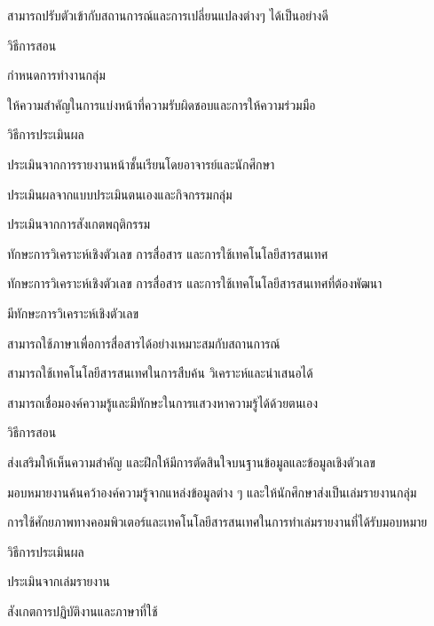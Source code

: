 \begin{edudev}
\begin{enumdev}
\begin{subenumdev}
						\item \withwc สามารถปรับตัวเข้ากับสถานการณ์และการเปลี่ยนแปลงต่างๆ ได้เป็นอย่างดี
					\end{subenumdev}
			\item วิธีการสอน
					\begin{subenumdev}
						\item กำหนดการทำงานกลุ่ม
						\item ให้ความสำคัญในการแบ่งหน้าที่ความรับผิดชอบและการให้ความร่วมมือ
					\end{subenumdev}
			\item วิธีการประเมินผล
					\begin{subenumdev}
						\item ประเมินจากการรายงานหน้าชั้นเรียนโดยอาจารย์และนักศึกษา
						\item ประเมินผลจากแบบประเมินตนเองและกิจกรรมกลุ่ม
						\item ประเมินจากการสังเกตพฤติกรรม
					\end{subenumdev}
		\end{enumdev}
\item ทักษะการวิเคราะห์เชิงตัวเลข การสื่อสาร และการใช้เทคโนโลยีสารสนเทศ
		\begin{enumdev}
			\item ทักษะการวิเคราะห์เชิงตัวเลข การสื่อสาร และการใช้เทคโนโลยีสารสนเทศที่ต้องพัฒนา
					\begin{subenumdev}
						\item \withbc มีทักษะการวิเคราะห์เชิงตัวเลข
						\item \withwc สามารถใช้ภาษาเพื่อการสื่อสารได้อย่างเหมาะสมกับสถานการณ์
						\item \withwc สามารถใช้เทคโนโลยีสารสนเทศในการสืบค้น วิเคราะห์และนำเสนอได้
						\item \withwc สามารถเชื่อมองค์ความรู้และมีทักษะในการแสวงหาความรู้ได้ด้วยตนเอง
					\end{subenumdev}
			\item วิธีการสอน
					\begin{subenumdev}
						\item ส่งเสริมให้เห็นความสำคัญ และฝึกให้มีการตัดสินใจบนฐานข้อมูลและข้อมูลเชิงตัวเลข
						\item มอบหมายงานค้นคว้าองค์ความรู้จากแหล่งข้อมูลต่าง ๆ และให้นักศึกษาส่งเป็นเล่มรายงานกลุ่ม
						\item การใช้ศักยภาพทางคอมพิวเตอร์และเทคโนโลยีสารสนเทศในการทำเล่มรายงานที่ได้รับมอบหมาย
					\end{subenumdev}
			\item วิธีการประเมินผล
					\begin{subenumdev}
						\item ประเมินจากเล่มรายงาน
						\item สังเกตการปฏิบัติงานและภาษาที่ใช้
					\end{subenumdev}
		\end{enumdev}
\end{edudev}

